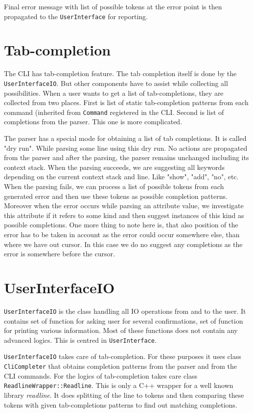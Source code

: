\documentclass[deska]{subfiles}
\begin{document}
Final error message with list of possible tokens at the error point is then propagated to the {\tt UserInterface} for reporting.

\section{Tab-completion}

The CLI has tab-completion feature. The tab completion itself is done by the {\tt UserInterfaceIO}. But other components
have to assist while collecting all possibilities. When a user wants to get a list of tab-completions, they are collected
from two places. First is list of static tab-completion patterns from each command (inherited from {\tt Command} registered
in the CLI. Second is list of completions from the parser. This one is more complicated.

The parser has a special mode for obtaining a list of tab completions. It is called "dry run". While parsing some line using
this dry run. No actions are propagated from the parser and after the parsing, the parser remains unchanged including its
context stack. When the parsing succeeds, we are suggesting all keywords depending on the current context stack and line.
Like "show", "add", "no", etc. When the parsing fails, we can process a list of possible tokens from each generated error
and then use these tokens as possible completion patterns. Moreover when the error occurs while parsing an attribute
value, we investigate this attribute if it refers to some kind and then suggest instances of this kind as possible completions.
One more thing to note here is, that also position of the error has to be taken in account as the error could occur somewhere
else, than where we have out cursor. In this case we do no suggest any completions as the error is somewhere before the
cursor.

\section{UserInterfaceIO}

{\tt UserInterfaceIO} is the class handling all IO operations from and to the user. It contains set of function for asking
user for several confirmations, set of function for printing various information. Most of these functions does not
contain any advanced logics. This is centred in {\tt UserInterface}.

{\tt UserInterfaceIO} takes care of tab-completion. For these purposes it uses class {\tt CliCompleter} that obtains completion
patterns from the parser and from the CLI commands. For the logics of tab-completion takes care class {\tt ReadlineWrapper::Readline}.
This is only a C++ wrapper for a well known library {\em readline}. It does splitting of the line to tokens and then comparing
these tokens with given tab-completions patterns to find out matching completions.
\end{document}
